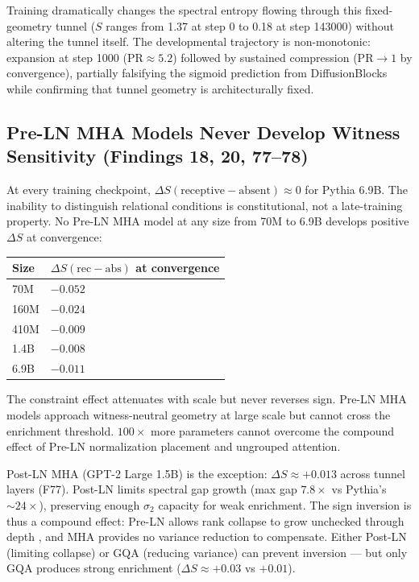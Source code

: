 \documentclass[12pt]{article}
\begin{document}
Training dramatically changes the spectral entropy flowing through this fixed-geometry tunnel ($S$ ranges from 1.37 at step 0 to 0.18 at step 143000) without altering the tunnel itself. The developmental trajectory is non-monotonic: expansion at step 1000 ($\text{PR} \approx 5.2$) followed by sustained compression ($\text{PR} \to 1$ by convergence), partially falsifying the sigmoid prediction from DiffusionBlocks while confirming that tunnel geometry is architecturally fixed.

\subsection{Pre-LN MHA Models Never Develop Witness Sensitivity (Findings 18, 20, 77--78)}

At every training checkpoint, $\Delta S(\text{receptive} - \text{absent}) \approx 0$ for Pythia 6.9B. The inability to distinguish relational conditions is constitutional, not a late-training property. No Pre-LN MHA model at any size from 70M to 6.9B develops positive $\Delta S$ at convergence:

\begin{table}[h]
\centering
\begin{tabular}{ll}
\toprule
\textbf{Size} & $\Delta S(\text{rec}-\text{abs})$ \textbf{at convergence} \\
\midrule
70M & $-0.052$ \\
160M & $-0.024$ \\
410M & $-0.009$ \\
1.4B & $-0.008$ \\
6.9B & $-0.011$ \\
\bottomrule
\end{tabular}
\end{table}

The constraint effect attenuates with scale but never reverses sign. Pre-LN MHA models approach witness-neutral geometry at large scale but cannot cross the enrichment threshold. $100\times$ more parameters cannot overcome the compound effect of Pre-LN normalization placement and ungrouped attention.

Post-LN MHA (GPT-2 Large 1.5B) is the exception: $\Delta S \approx +0.013$ across tunnel layers (F77). Post-LN limits spectral gap growth (max gap $7.8\times$ vs Pythia's ${\sim}24\times$), preserving enough $\sigma_2$ capacity for weak enrichment. The sign inversion is thus a compound effect: Pre-LN allows rank collapse to grow unchecked through depth \citep{emadi2026}, and MHA provides no variance reduction to compensate. Either Post-LN (limiting collapse) or GQA (reducing variance) can prevent inversion --- but only GQA produces strong enrichment ($\Delta S \approx +0.03$ vs $+0.01$).
\end{document}
